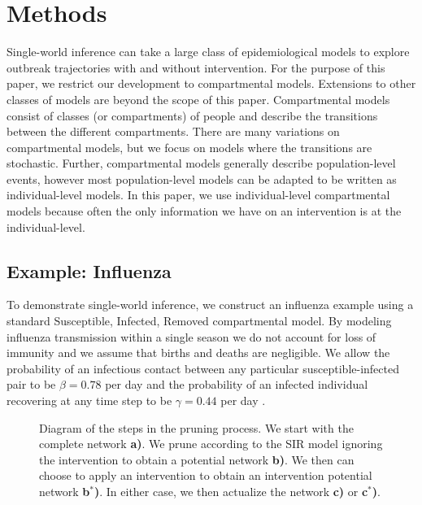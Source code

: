 \documentclass[PTRSB]{rsos}
\begin{document}
\section{Methods}
Single-world inference can take a large class of epidemiological models to explore outbreak trajectories with and without intervention. 
For the purpose of this paper, we restrict our development to compartmental models.
Extensions to other classes of models are beyond the scope of this paper.
Compartmental models consist of classes (or compartments) of people and describe the transitions between the different compartments.
There are many variations on compartmental models, but we focus on models where the transitions are stochastic.
Further, compartmental models generally describe population-level events, however most population-level models can be adapted to be written as individual-level models.
In this paper, we use individual-level compartmental models because often the only information we have on an intervention is at the individual-level.

\subsection{Example: Influenza}
To demonstrate single-world inference, we construct an influenza example using a standard Susceptible, Infected, Removed compartmental model.
By modeling influenza transmission within a single season we do not account for loss of immunity and we assume that births and deaths are negligible.
We allow the probability of an infectious contact between any particular susceptible-infected pair to be $\beta = 0.78$ per day and the probability of an infected individual recovering at any time step to be $\gamma = 0.44$ per day \cite{forsberg-white-et-al:2009}.

\begin{figure}[hp]
\caption{Diagram of the steps in the pruning process.  We start with the complete network \textbf{a)}.  We prune according to the SIR model ignoring the intervention to obtain a potential network \textbf{b)}.  We then can choose to apply an intervention to obtain an intervention potential network \textbf{b${}^*$)}.  In either case, we then actualize the network \textbf{c)} or \textbf{c${}^*$)}.}
\label{fig:outline}
\end{figure}
\end{document}
